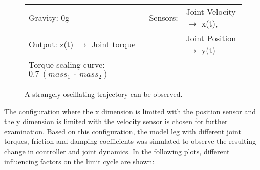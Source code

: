 \documentclass[main]{subfiles}
\begin{document}
\begin{figure}[H]
	\centering
	\begin{minipage}{1.3\textwidth}
	\hspace*{-5em}
	\end{minipage}
	\caption[Joint Velocity \(\rightarrow\) x(t) and Joint Position \(\rightarrow\) y(t) limited chaotic controller controlling model leg]{A strangely oscillating trajectory can be observed.}
	\begin{tabular}{l|ll}
	\hline 
	Gravity: 0g  & Sensors: & Joint Velocity \(\rightarrow\) x(t),\\
	 Output: z(t) \(\rightarrow\) Joint torque & & Joint Position \(\rightarrow\) y(t) \\
	  Torque scaling curve: \(0.7~(mass_1~\cdot~mass_2)\) & & - \\
	  \hline
	\end{tabular}

	\label{figure:limited-model-leg6}
\end{figure}

The configuration where the x dimension is limited with the position sensor and the y dimension is limited with the velocity sensor is chosen for further examination. %
%
Based on this configuration, the model leg with different joint torques, friction and damping coefficients was simulated to observe the resulting change in controller and joint dynamics. %
%
In the following plots, different influencing factors on the limit cycle are shown:
\end{document}
